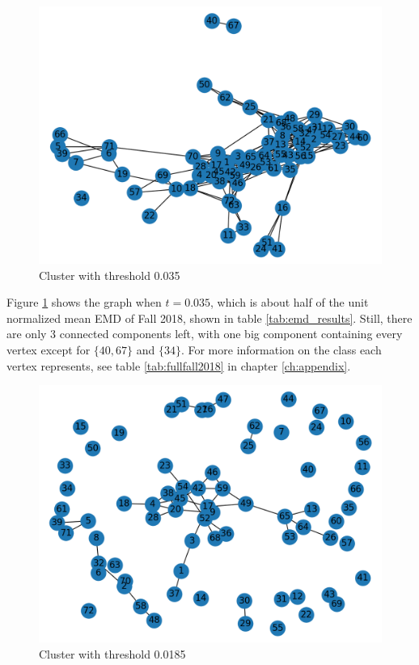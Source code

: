 \documentclass[12pt,letterpaper,oneside,openany]{book}
\begin{document}
\begin{figure}
	\centering
	\includegraphics[width=\textwidth]{./images/n2018_th_0p035_2.png}
	\caption{Cluster with threshold 0.035}
	\label{fig:cluster18t035}
\end{figure}

Figure \ref{fig:cluster18t035} shows the graph when $t=0.035$, which is about half of the unit normalized mean EMD of Fall 2018, shown in table \ref{tab:emd_results}. Still, there are only 3 connected components left, with one big component containing every vertex except for $\{40, 67\}$ and $\{34\}$. For more information on the class each vertex represents, see table \ref{tab:fullfall2018} in chapter \ref{ch:appendix}.

\begin{figure}
	\centering
	\includegraphics[width=\textwidth]{./images/n2018_th_0p0185_2.png}
	\caption{Cluster with threshold 0.0185}
	\label{fig:cluster18t0185}
\end{figure}
\end{document}
